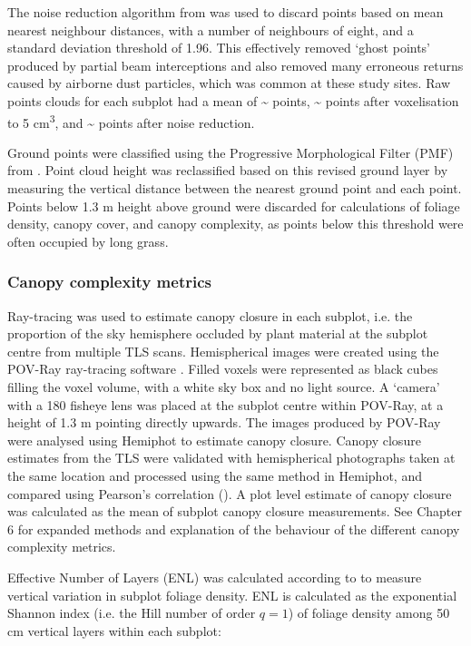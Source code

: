 \documentclass[11pt,a4paper]{article}
\begin{document}
The noise reduction algorithm from \citet{Rusu2008} was used to discard points based on mean nearest neighbour distances, with a number of neighbours of eight, and a standard deviation threshold of 1.96. This effectively removed `ghost points' produced by partial beam interceptions and also removed many erroneous returns caused by airborne dust particles, which was common at these study sites. Raw points clouds for each subplot had a mean of \textasciitilde{}\rawpt{} points, \textasciitilde{}\voxelpt{} points after voxelisation to 5 cm\textsuperscript{3}, and \textasciitilde{}\subpt{} points after noise reduction. 

Ground points were classified using the Progressive Morphological Filter (PMF) from \citet{Zhang2003}. Point cloud height was reclassified based on this revised ground layer by measuring the vertical distance between the nearest ground point and each point. Points below 1.3 m height above ground were discarded for calculations of foliage density, canopy cover, and canopy complexity, as points below this threshold were often occupied by long grass.

\subsubsection{Canopy complexity metrics}

Ray-tracing was used to estimate canopy closure in each subplot, i.e. the proportion of the sky hemisphere occluded by plant material at the subplot centre from multiple TLS scans. Hemispherical images were created using the POV-Ray ray-tracing software \citep{Povray2004}. Filled voxels were represented as black cubes filling the voxel volume, with a white sky box and no light source. A `camera' with a 180\textdegree{} fisheye lens was placed at the subplot centre within POV-Ray, at a height of 1.3 m pointing directly upwards. The images produced by POV-Ray were analysed using Hemiphot \citep{HemiPhot} to estimate canopy closure. Canopy closure estimates from the TLS were validated with hemispherical photographs taken at the same location and processed using the same method in Hemiphot, and compared using Pearson's correlation (\hemiCor{}). A plot level estimate of canopy closure was calculated as the mean of subplot canopy closure measurements. See Chapter 6 for expanded methods and explanation of the behaviour of the different canopy complexity metrics.

Effective Number of Layers (ENL) was calculated according to \citet{Ehbrecht2016} to measure vertical variation in subplot foliage density. ENL is calculated as the exponential Shannon index (i.e. the Hill number of order $q=1$) of foliage density among 50 cm vertical layers within each subplot:
\end{document}
